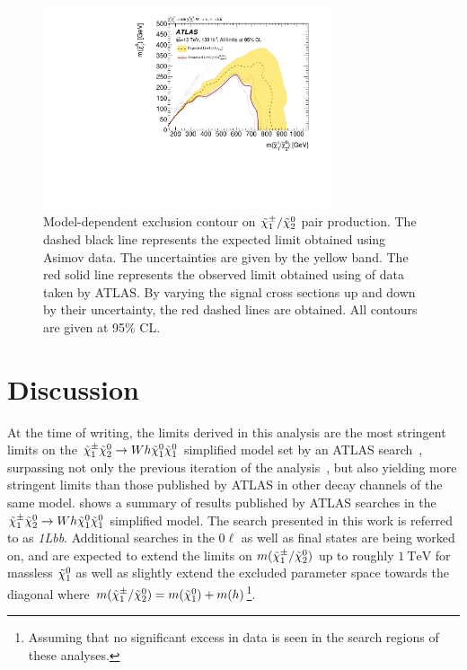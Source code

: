  \begin{figure}
	\centering\includegraphics[width=0.75\textwidth]{contourPlotterWh1Lbb}
	\caption{Model-dependent exclusion contour on $\tilde{\chi}_1^\pm/\tilde{\chi}_2^0$ pair production. The dashed black line represents the expected limit obtained using Asimov data. The uncertainties are given by the yellow band. The red solid line represents the observed limit obtained using \onethirtynineifb of data taken by ATLAS. By varying the signal cross sections up and down by their uncertainty, the red dashed lines are obtained. All contours are given at 95\% CL. }
	\label{fig:result_exclusion}
\end{figure}


\section{Discussion}

At the time of writing, the limits derived in this analysis are the most stringent limits on the $\tilde{\chi}_1^\pm\tilde{\chi}_2^0\rightarrow Wh\tilde{\chi}_1^0\tilde{\chi}_1^0$ simplified model set by an ATLAS search~\cite{ATL-PHYS-PUB-2020-020}, surpassing not only the previous iteration of the analysis~\cite{SUSY-2017-01}, but also yielding more stringent limits than those published by ATLAS in other decay channels of the same model.  shows a summary of results published by ATLAS searches in the $\tilde{\chi}_1^\pm\tilde{\chi}_2^0\rightarrow Wh\tilde{\chi}_1^0\tilde{\chi}_1^0$ simplified model. The search presented in this work is referred to as \textit{1Lbb}. Additional searches in the $0\ell$ as well as \onelepton final states are being worked on, and are expected to extend the limits on $m(\tilde{\chi}_1^\pm/\tilde{\chi}_2^0)$ up to roughly $\SI{1}{\TeV}$ for massless $\tilde{\chi}_1^0$ as well as slightly extend the excluded parameter space towards the diagonal where $m(\tilde{\chi}_1^\pm/\tilde{\chi}_2^0) = m(\tilde{\chi}_1^0) + m(h)$\footnote{Assuming that no significant excess in data is seen in the search regions of these analyses.}.


